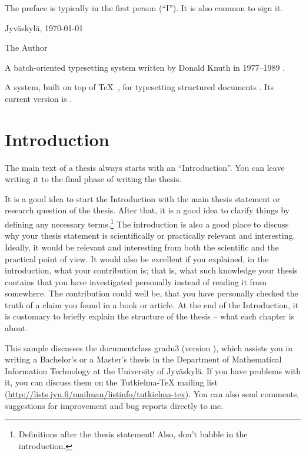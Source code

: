 \documentclass[utf8,english]{gradu3}
\begin{document}
The preface is typically in the first person (``I'').  It is also common
to sign it.

Jyväskylä, \today

\bigskip

The Author

\begin{thetermlist}
\item[\TeX] A batch-oriented typesetting system written by 
Donald Knuth in 1977--1989 \parencite[see][]{knuth86:_texbook}. 
\item[\LaTeX] A system, built on top of \TeX\
  \parencite{knuth86:_texbook}, for typesetting structured
  documents \parencite[see][]{lamport94:_latex}.  Its current version
  is \LaTeXe.
\end{thetermlist}

\mainmatter

\chapter{Introduction}

The main text of a thesis always starts with an ``Introduction''.
You can leave writing it to the final phase of writing the thesis.

It is a good idea to start the Introduction with the main thesis
statement or research question of the thesis.  After that, it is a
good idea to clarify things by defining any necessary
terms.\footnote{Definitions after the thesis statement!  Also, don't
  babble in the introduction.}  The introduction is also a good place
to discuss why your thesis statement is scientifically or practically
relevant and interesting.  Ideally, it would be relevant and
interesting from both the scientific and the practical point of view.
It would also be excellent if you explained, in the introduction, what
your contribution is; that is, what such knowledge your thesis
contains that you have investigated personally instead of reading it
from somewhere.  The contribution could well be, that you have
personally checked the truth of a claim you found in a book or
article.  At the end of the Introduction, it is customary to briefly
explain the structure of the thesis -- what each chapter is about.

This sample discusses the documentclass gradu3 (version
\graduclsversion), which assists you in writing a Bachelor's or a
Master's thesis in the Department of Mathematical Information
Technology at the University of Jyväskylä.  If you have problems with
it, you can discuss them on the Tutkielma-TeX mailing list
(\url{http://lists.jyu.fi/mailman/listinfo/tutkielma-tex}).  You can
also send comments, suggestions for improvement and bug reports
directly to me.
\end{document}
